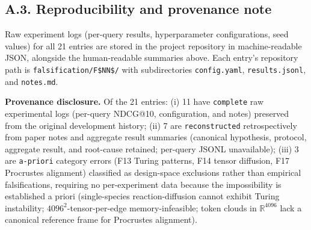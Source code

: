\documentclass[review,1p,11pt]{elsarticle}
\newcommand{\R}{\mathbb{R}}
\begin{document}
\subsection*{A.3. Reproducibility and provenance note}
\label{subsec:reproducibility-supp}

Raw experiment logs (per-query results, hyperparameter configurations, seed values) for all 21 entries are stored in the project repository in machine-readable JSON, alongside the human-readable summaries above. Each entry's repository path is \texttt{falsification/F\$NN\$/} with subdirectories \texttt{config.yaml}, \texttt{results.jsonl}, and \texttt{notes.md}.

\textbf{Provenance disclosure.} Of the 21 entries: (i) 11 have \texttt{complete} raw experimental logs (per-query NDCG@10, configuration, and notes) preserved from the original development history; (ii) 7 are \texttt{reconstructed} retrospectively from paper notes and aggregate result summaries (canonical hypothesis, protocol, aggregate result, and root-cause retained; per-query JSONL unavailable); (iii) 3 are \texttt{a-priori} category errors (F13 Turing patterns, F14 tensor diffusion, F17 Procrustes alignment) classified as design-space exclusions rather than empirical falsifications, requiring no per-experiment data because the impossibility is established a priori (single-species reaction-diffusion cannot exhibit Turing instability; $4096^2$-tensor-per-edge memory-infeasible; token clouds in $\R^{4096}$ lack a canonical reference frame for Procrustes alignment).
\end{document}
